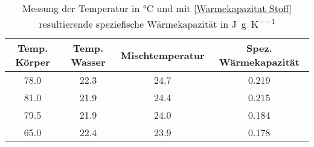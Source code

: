 \begin{table}[h]
\begin{center}
\begin{tabular}{c | c | c | c}
	Temp. Körper & Temp. Wasser & Mischtemperatur & Spez. Wärmekapazität \\
	\hline
	78.0 & 22.3 & 24.7 & 0.219 \\
	81.0 & 21.9 & 24.4 & 0.215 \\
	79.5 & 21.9 & 24.0 & 0.184 \\
	65.0 & 22.4 & 23.9 & 0.178 \\
\end{tabular}
	\caption{Messung der Temperatur in \si{\celsius} und mit \eqref{Warmekapazitat Stoff} resultierende speziefische Wärmekapazität in \si{\joule\per\gram\per\kelvin}}
\end{center}
\end{table}